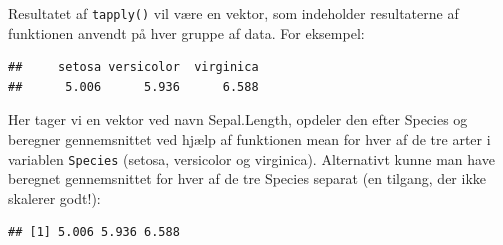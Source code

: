 \documentclass[
]{book}
\newenvironment{Shaded}{\begin{snugshade}}{\end{snugshade}}
\newcommand{\CommentTok}[1]{\textcolor[rgb]{0.56,0.35,0.01}{\textit{#1}}}
\newcommand{\FunctionTok}[1]{\textcolor[rgb]{0.13,0.29,0.53}{\textbf{#1}}}
\newcommand{\NormalTok}[1]{#1}
\newcommand{\OtherTok}[1]{\textcolor[rgb]{0.56,0.35,0.01}{#1}}
\newcommand{\SpecialCharTok}[1]{\textcolor[rgb]{0.81,0.36,0.00}{\textbf{#1}}}
\newcommand{\StringTok}[1]{\textcolor[rgb]{0.31,0.60,0.02}{#1}}
\theoremstyle{definition}
\theoremstyle{definition}
\theoremstyle{definition}
\theoremstyle{definition}
\theoremstyle{remark}
\begin{document}
Resultatet af \texttt{tapply()} vil være en vektor, som indeholder resultaterne af funktionen anvendt på hver gruppe af data. For eksempel:

\begin{Shaded}
\end{Shaded}

\begin{verbatim}
##     setosa versicolor  virginica 
##      5.006      5.936      6.588
\end{verbatim}

Her tager vi en vektor ved navn Sepal.Length, opdeler den efter Species og beregner gennemsnittet ved hjælp af funktionen mean for hver af de tre arter i variablen \texttt{Species} (setosa, versicolor og virginica). Alternativt kunne man have beregnet gennemsnittet for hver af de tre Species separat (en tilgang, der ikke skalerer godt!):

\begin{Shaded}
\end{Shaded}

\begin{verbatim}
## [1] 5.006 5.936 6.588
\end{verbatim}
\end{document}
